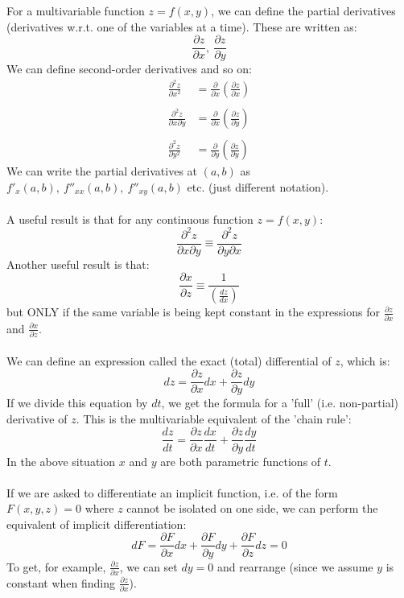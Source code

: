 \documentclass{scrartcl}
\begin{document}
For a multivariable function $ z = f(x, y) $, we can define the partial derivatives (derivatives w.r.t. one of the variables at a time). These are written as:
\begin{equation}
\frac{\partial z}{\partial x}, \ \frac{\partial z}{\partial y}
\end{equation}
We can define second-order derivatives and so on:
\begin{align}
\frac{\partial^{2} z}{\partial x^{2}} & = \frac{\partial}{\partial x} (\frac{\partial z}{\partial x}) \\\\
\frac{\partial^{2} z}{\partial x \partial y} & = \frac{\partial}{\partial x} (\frac{\partial z}{\partial y}) \\\\
\frac{\partial^{2} z}{\partial y^{2}} & = \frac{\partial}{\partial y} (\frac{\partial z}{\partial y})
\end{align}
We can write the partial derivatives at $ (a, b) $ as $ f'_{x}(a, b), \ f''_{xx}(a, b), \ f''_{xy}(a, b) $ etc. (just different notation).
\\\\
A useful result is that for any continuous function $ z = f(x, y) $:
\begin{equation}
\frac{\partial^{2} z}{\partial x \partial y} \equiv \frac{\partial^{2} z}{\partial y \partial x}
\end{equation}
Another useful result is that:
\begin{equation}
\frac{\partial x}{\partial z} \equiv \frac{1}{(\frac{dz}{dx})}
\end{equation}
but ONLY if the same variable is being kept constant in the expressions for $ \frac{\partial z}{\partial x} $ and $ \frac{\partial x}{\partial z} $.
\\\\
We can define an expression called the exact (total) differential of $ z $, which is:
\begin{equation}
dz = \frac{\partial z}{\partial x}dx + \frac{\partial z}{\partial y}dy
\end{equation}
If we divide this equation by $ dt $, we get the formula for a 'full' (i.e. non-partial) derivative of $ z $. This is the multivariable equivalent of the 'chain rule':
\begin{equation}
\frac{dz}{dt} = \frac{\partial z}{\partial x}\frac{dx}{dt} + \frac{\partial z}{\partial y}\frac{dy}{dt}
\end{equation}
In the above situation $ x $ and $ y $ are both parametric functions of $ t $.
\\\\
If we are asked to differentiate an implicit function, i.e. of the form $ F(x, y, z) = 0 $ where $ z $ cannot be isolated on one side, we can perform the equivalent of implicit differentiation:
\begin{equation}
dF = \frac{\partial F}{\partial x}dx + \frac{\partial F}{\partial y}dy + \frac{\partial F}{\partial z}dz = 0
\end{equation}
To get, for example, $ \frac{\partial z}{\partial x} $, we can set $ dy = 0 $ and rearrange (since we assume $ y $ is constant when finding $ \frac{\partial z}{\partial x} $).
\end{document}
